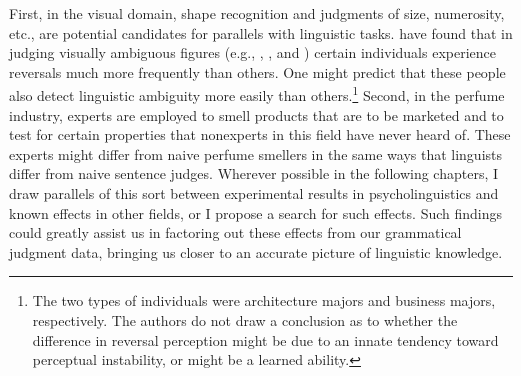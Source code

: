 First, in the visual domain, shape recognition and judgments of size, numerosity, etc., are potential candidates for parallels with linguistic tasks. \citet{BergumEtAl1979boje,BergumEtAl1979jebo} have found that in judging visually ambiguous figures (e.g., , ,  and ) certain individuals experience reversals much more frequently than others. One might predict that these people also detect linguistic ambiguity more easily than others.\footnote{The two types of individuals were architecture majors and business majors, respectively. The authors do not draw a conclusion as to whether the difference in reversal perception might be due
to
an innate tendency toward perceptual instability, or might be a learned ability.}
 Second, in the perfume industry, experts are employed to smell products that are to be marketed and to test for certain properties that nonexperts in this field have never heard of. These experts might differ from naive perfume smellers in the same ways that linguists differ from naive sentence judges. Wherever possible in the following chapters, I draw parallels of this sort between experimental results in psycholinguistics and known effects in other fields, or I propose a search for such effects. Such findings could greatly assist us in factoring out these effects from our grammatical judgment data, bringing us closer to an accurate picture of linguistic knowledge.

